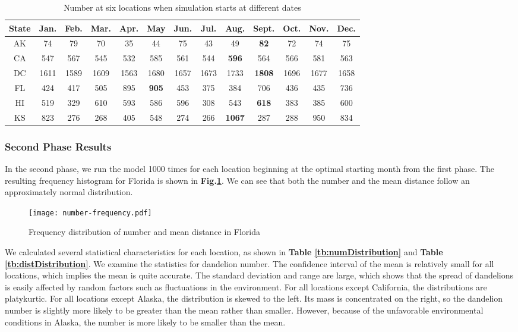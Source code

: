 \documentclass[12pt]{article}
\begin{document}
			{
				\fontsize{10}{14}\selectfont
				{
					\begin{longtable}{ccccccccccccc}
						\caption{Number at six locations when simulation starts at different dates}
						\label{tb:start}\\
						\toprule
						State&Jan.&Feb.&Mar.&Apr.&May&Jun.&Jul.&Aug.&Sept.&Oct.&Nov.&Dec.\\
						\toprule
						AK&74&79&70&35&44&75&43&49&\color{blue}\textbf{82}&72&74&75\\
						CA&547&567&545&532&585&561&544&\color{blue}\textbf{596}&564&566&581&563\\
						DC&1611&1589&1609&1563&1680&1657&1673&1733&\color{blue}\textbf{1808}&1696&1677&1658\\
						FL&424&417&505&895&\color{blue}\textbf{905}&453&375&384&706&436&435&736\\
						HI&519&329&610&593&586&596&308&543&\color{blue}\textbf{618}&383&385&600\\
						KS&823&276&268&405&548&274&266&\color{blue}\textbf{1067}&287&288&950&834\\
						\bottomrule
					\end{longtable}
				}
			}
			
			
			
		\subsubsection{Second Phase Results}
		
			In the second phase, we run the model 1000 times for each location beginning at the optimal starting month from the first phase.  The resulting frequency histogram for Florida is shown in \textbf{Fig.\ref{fig:freqDand}}.  We can see that both the number and the mean distance follow an approximately normal distribution.  
			
			\begin{figure}[htbp]
				\centering
				\texttt{[image: number-frequency.pdf]}
				\caption{Frequency distribution of number and mean distance in Florida}
				\label{fig:freqDand}
			\end{figure}
			
			We calculated several statistical characteristics for each location, as shown in \textbf{Table \ref{tb:numDistribution}} and \textbf{Table \ref{tb:distDistribution}}.	 We examine the statistics for dandelion number.  The confidence interval of the mean is relatively small for all locations, which implies the mean is quite accurate.  The standard deviation and range are large, which shows that the spread of dandelions is easily affected by random factors such as fluctuations in the environment.  For all locations except California, the distributions are platykurtic.  For all locations except Alaska, the distribution is skewed to the left.  Its mass is concentrated on the right, so the dandelion number is slightly more likely to be greater than the mean rather than smaller.  However, because of the unfavorable environmental conditions in Alaska, the number is more likely to be smaller than the mean.
			
\end{document}
